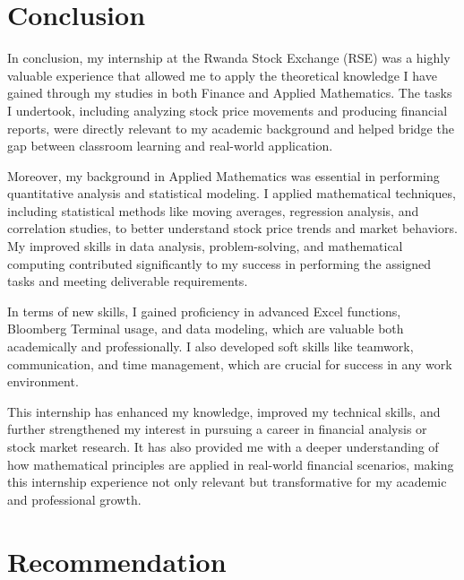 \documentclass{article}
\begin{document}
\begin{titlepage}
\begin{titlepage}
\begin{flushleft}
\begin{flushleft}
\section{\textbf{\huge{Conclusion}}}
\vspace{0.2cm}

In conclusion, my internship at the Rwanda Stock Exchange (RSE) was a highly valuable experience that allowed me to apply the theoretical knowledge I have gained through my studies in both Finance and Applied Mathematics. The tasks I undertook, including analyzing stock price movements and producing financial reports, were directly relevant to my academic background and helped bridge the gap between classroom learning and real-world application.
\vspace{0.2cm}

Moreover, my background in Applied Mathematics was essential in performing quantitative analysis and statistical modeling. I applied mathematical techniques, including statistical methods like moving averages, regression analysis, and correlation studies, to better understand stock price trends and market behaviors. My improved skills in data analysis, problem-solving, and mathematical computing contributed significantly to my success in performing the assigned tasks and meeting deliverable requirements.
\vspace{0.2cm}

In terms of new skills, I gained proficiency in advanced Excel functions, Bloomberg Terminal usage, and data modeling, which are valuable both academically and professionally. I also developed soft skills like teamwork, communication, and time management, which are crucial for success in any work environment.
\vspace{0.2cm}

This internship has enhanced my knowledge, improved my technical skills, and further strengthened my interest in pursuing a career in financial analysis or stock market research. It has also provided me with a deeper understanding of how mathematical principles are applied in real-world financial scenarios, making this internship experience not only relevant but transformative for my academic and professional growth.
\vspace{0.7cm}
\newpage

\section{\textbf{\huge{Recommendation }}}
\vspace{0.15cm}


\end{flushleft}
\end{flushleft}
\end{titlepage}
\end{titlepage}
\end{document}
